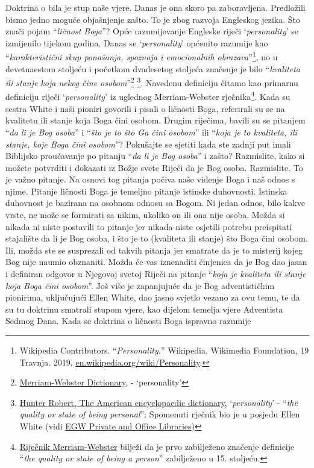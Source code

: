 Doktrina o  bila je stup naše vjere. Danas je ona skoro pa zaboravljena. Predložili bismo jedno moguće objašnjenje zašto. To je zbog razvoja Engleskog jezika. Što znači pojam “\textit{ličnost Boga}”? Opće razumijevanje Engleske riječi ‘\textit{personality}’ se izmijenilo tijekom godina. Danas se ‘\textit{personality}’ općenito razumije kao “\textit{karakteristični skup ponašanja, spoznaja i emocionalnih obrazaca}”\footnote{Wikipedia Contributors. “\textit{Personality.}” Wikipedia, Wikimedia Foundation, 19 Travnja. 2019, \href{https://en.wikipedia.org/wiki/Personality}{en.wikipedia.org/wiki/Personality}.}, no u devetnaestom stoljeću i početkom dvadesetog stoljeća značenje je bilo “\textit{kvaliteta ili stanje koja nekog čine osobom}”\footnote{\href{https://www.merriam-webster.com/dictionary/personality}{Merriam-Webster Dictionary}, - ‘personality’} \footnote{\href{https://babel.hathitrust.org/cgi/pt?id=mdp.39015050663213&view=1up&seq=780}{Hunter Robert, The American encyclopaedic dictionary}, ‘\textit{personality}’ - “\textit{the quality or state of being personal}”; Spomenuti rječnik bio je u posjedu Ellen White (vidi \href{https://repo.adventistdigitallibrary.org/PDFs/adl-22/adl-22251050.pdf?_ga=2.116010630.1065317374.1621993520-1506151612.1617862694&fbclid=IwAR3vwmp8jxtnpPEKv0KD9mCv8dJpmRGoyIXW0CkbQAjbU0h6YaBGqhgBzbk}{EGW Private and Office Libraries})}. Navedenu definiciju čitamo kao primarnu definiciju riječi ‘\textit{personality}’ iz uglednog Merriam-Webster rječnika\footnote{\href{https://www.merriam-webster.com/dictionary/personality\#word-history}{Riječnik Merriam-Webster} bilježi da je prvo zabilježeno značenje definicije “\textit{the quality or state of being a person}” zabilježeno u 15. stoljeću.}. Kada su sestra White i naši pioniri govorili i pisali o ličnosti Boga, referirali su se na kvalitetu ili stanje koja Boga čini osobom. Drugim riječima, bavili su se pitanjem “\textit{da li je Bog osoba}” i “\textit{što je to što Ga čini osobom}” ili “\textit{koja je to kvaliteta, ili stanje, koje Boga čini osobom}”? Pokušajte se sjetiti kada ste zadnji put imali Biblijsko proučavanje po pitanju “\textit{da li je Bog osoba}” i zašto? Razmislite, kako si možete potvrditi i dokazati iz Božje svete Riječi da je Bog osoba. Razmislite. To je važno pitanje. Na osnovi tog pitanja počiva naše viđenje Boga i naš odnos s njime. Pitanje ličnosti Boga je temeljno pitanje istinske duhovnosti. Istinska duhovnost je bazirana na osobnom odnosu sa Bogom. Ni jedan odnos, bilo kakve vrste, ne može se formirati sa nikim, ukoliko on ili ona nije osoba. Možda si nikada ni niste postavili to pitanje jer nikada niste osjetili potrebu preispitati stajalište da li je Bog osoba, i što je to (kvaliteta ili stanje) što Boga čini osobom. Ili, možda ste se susprezali od takvih pitanja jer smatrate da je to misterij kojeg Bog nije naumio obznaniti. Možda će vas iznenaditi činjenica da je Bog dao jasan i definiran odgovor u Njegovoj svetoj Riječi na pitanje “\textit{koja je kvaliteta ili stanje koja Boga čini osobom}”. Još više je zapanjujuće da je Bog adventističkim pionirima, uključujući Ellen White, dao jasno svjetlo vezano za ovu temu, te da su tu doktrinu smatrali stupom vjere, kao dijelom temelja vjere Adventista Sedmog Dana. Kada se doktrina o ličnosti Boga ispravno razumije 